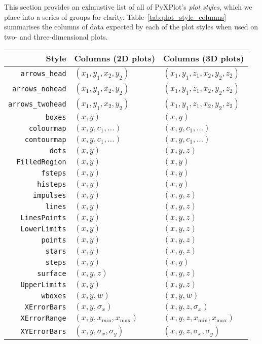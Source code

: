 This section provides an exhaustive list of all of PyXPlot's {\it plot styles},
which we place into a series of groups for clarity.
Table~\ref{tab:plot_style_columns} summarises the columns of data expected by
each of the plot styles when used on two- and three-dimensional plots.

\begin{table}
\begin{tabular}{|rll|}
\hline
{\bf Style} & {\bf Columns (2D plots)} & {\bf Columns (3D plots)} \\
\hline
{\tt arrows\_head} & $(x_1,y_1,x_2,y_2)$ & $(x_1,y_1,z_1,x_2,y_2,z_2)$ \\
{\tt arrows\_nohead} & $(x_1,y_1,x_2,y_2)$ & $(x_1,y_1,z_1,x_2,y_2,z_2)$ \\
{\tt arrows\_twohead} & $(x_1,y_1,x_2,y_2)$ & $(x_1,y_1,z_1,x_2,y_2,z_2)$ \\
{\tt boxes} & $(x,y)$ & $(x,y)$ \\
{\tt colourmap} & $(x,y,c_1,\ldots)$ & $(x,y,c_1,\ldots)$ \\
{\tt contourmap} & $(x,y,c_1,\ldots)$ & $(x,y,c_1,\ldots)$ \\
{\tt dots} & $(x,y)$ & $(x,y,z)$ \\
{\tt FilledRegion} & $(x,y)$ & $(x,y)$ \\
{\tt fsteps} & $(x,y)$ & $(x,y)$ \\
{\tt histeps} & $(x,y)$ & $(x,y)$ \\
{\tt impulses} & $(x,y)$ & $(x,y,z)$ \\
{\tt lines} & $(x,y)$ & $(x,y,z)$ \\
{\tt LinesPoints} & $(x,y)$ & $(x,y,z)$ \\
{\tt LowerLimits} & $(x,y)$ & $(x,y,z)$ \\
{\tt points} & $(x,y)$ & $(x,y,z)$ \\
{\tt stars} & $(x,y)$ & $(x,y,z)$ \\
{\tt steps} & $(x,y)$ & $(x,y)$ \\
{\tt surface} & $(x,y,z)$ & $(x,y,z)$ \\
{\tt UpperLimits} & $(x,y)$ & $(x,y,z)$ \\
{\tt wboxes} & $(x,y,w)$ & $(x,y,w)$ \\
{\tt XErrorBars} & $(x,y,\sigma_x)$ & $(x,y,z,\sigma_x)$ \\
{\tt XErrorRange} & $(x,y,x_\mathrm{min},x_\mathrm{max})$ & $(x,y,z,x_\mathrm{min},x_\mathrm{max})$ \\
{\tt XYErrorBars} & $(x,y,\sigma_x,\sigma_y)$ & $(x,y,z,\sigma_x,\sigma_y)$ \\

\end{tabular}
\end{table}
